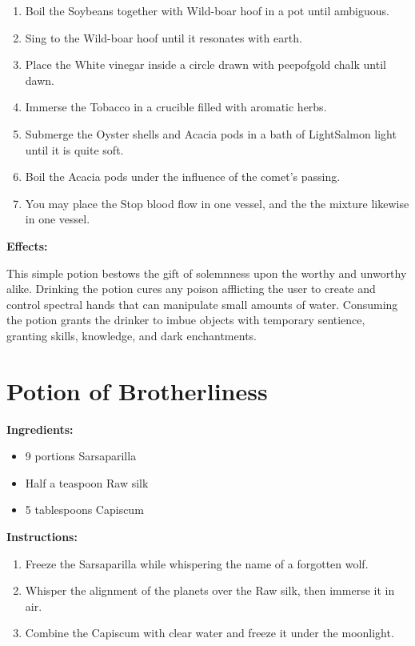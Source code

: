 \documentclass{article}
\begin{document}
\begin{enumerate}
  \item Boil the Soybeans together with Wild-boar hoof in a pot until ambiguous.
  \item Sing to the Wild-boar hoof until it resonates with earth.
  \item Place the White vinegar inside a circle drawn with peepofgold chalk until dawn.
  \item Immerse the Tobacco in a crucible filled with aromatic herbs.
  \item Submerge the Oyster shells and Acacia pods in a bath of LightSalmon light until it is quite soft.
  \item Boil the Acacia pods under the influence of the comet’s passing.
  \item You may place the Stop blood flow in one vessel, and the the mixture likewise in one vessel.
\end{enumerate}

\textbf{Effects:}

This simple potion bestows the gift of solemnness upon the worthy and unworthy alike. Drinking the potion cures any poison afflicting the user to create and control spectral hands that can manipulate small amounts of water. Consuming the potion grants the drinker to imbue objects with temporary sentience, granting skills, knowledge, and dark enchantments.

\newpage
\section*{Potion of Brotherliness}

\textbf{Ingredients:}

\begin{itemize}
  \item 9 portions Sarsaparilla
  \item Half a teaspoon Raw silk
  \item 5 tablespoons Capiscum
\end{itemize}

\textbf{Instructions:}

\begin{enumerate}
  \item Freeze the Sarsaparilla while whispering the name of a forgotten wolf.
  \item Whisper the alignment of the planets over the Raw silk, then immerse it in air.
  \item Combine the Capiscum with clear water and freeze it under the moonlight.
\end{enumerate}
\end{document}
